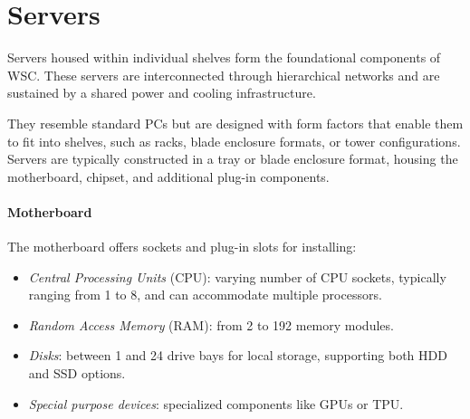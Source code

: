 \section{Servers}

Servers housed within individual shelves form the foundational components of WSC. 
These servers are interconnected through hierarchical networks and are sustained by a shared power and cooling infrastructure.

They resemble standard PCs but are designed with form factors that enable them to fit into shelves, such as racks, blade enclosure formats, or tower configurations.
Servers are typically constructed in a tray or blade enclosure format, housing the motherboard, chipset, and additional plug-in components.

\paragraph*{Motherboard}
The motherboard offers sockets and plug-in slots for installing:
\begin{itemize}
    \item \textit{Central Processing Units} (CPU): varying number of CPU sockets, typically ranging from 1 to 8, and can accommodate multiple processors.
    \item \textit{Random Access Memory} (RAM): from 2 to 192 memory modules.
    \item \textit{Disks}: between 1 and 24 drive bays for local storage, supporting both HDD and SSD options.
    \item \textit{Special purpose devices}: specialized components like GPUs or TPU. 
\end{itemize}

